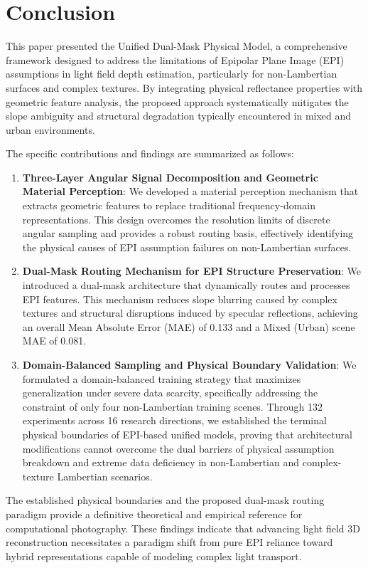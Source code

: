 \documentclass[lettersize,journal]{IEEEtran}
\begin{document}
\section{Conclusion}

This paper presented the Unified Dual-Mask Physical Model, a comprehensive framework designed to address the limitations of Epipolar Plane Image (EPI) assumptions in light field depth estimation, particularly for non-Lambertian surfaces and complex textures. By integrating physical reflectance properties with geometric feature analysis, the proposed approach systematically mitigates the slope ambiguity and structural degradation typically encountered in mixed and urban environments. 

The specific contributions and findings are summarized as follows:
\begin{enumerate}
\item \textbf{Three-Layer Angular Signal Decomposition and Geometric Material Perception}: We developed a material perception mechanism that extracts geometric features to replace traditional frequency-domain representations. This design overcomes the resolution limits of discrete angular sampling and provides a robust routing basis, effectively identifying the physical causes of EPI assumption failures on non-Lambertian surfaces.
\item \textbf{Dual-Mask Routing Mechanism for EPI Structure Preservation}: We introduced a dual-mask architecture that dynamically routes and processes EPI features. This mechanism reduces slope blurring caused by complex textures and structural disruptions induced by specular reflections, achieving an overall Mean Absolute Error (MAE) of 0.133 and a Mixed (Urban) scene MAE of 0.081.
\item \textbf{Domain-Balanced Sampling and Physical Boundary Validation}: We formulated a domain-balanced training strategy that maximizes generalization under severe data scarcity, specifically addressing the constraint of only four non-Lambertian training scenes. Through 132 experiments across 16 research directions, we established the terminal physical boundaries of EPI-based unified models, proving that architectural modifications cannot overcome the dual barriers of physical assumption breakdown and extreme data deficiency in non-Lambertian and complex-texture Lambertian scenarios.
\end{enumerate}

The established physical boundaries and the proposed dual-mask routing paradigm provide a definitive theoretical and empirical reference for computational photography. These findings indicate that advancing light field 3D reconstruction necessitates a paradigm shift from pure EPI reliance toward hybrid representations capable of modeling complex light transport.
\end{document}
